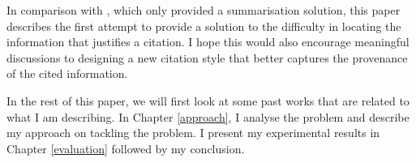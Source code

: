 In comparison with \cite{csibs}, which only provided a summarisation solution, this paper describes the first attempt to provide a solution to the difficulty in locating the information that justifies a citation. I hope this would also encourage meaningful discussions to designing a new citation style that better captures the provenance of the cited information.

In the rest of this paper, we will first look at some past works that are related to what I am describing. In Chapter \ref{approach}, I analyse the problem and describe my approach on tackling the problem. I present my experimental results in Chapter \ref{evaluation} followed by my conclusion.
